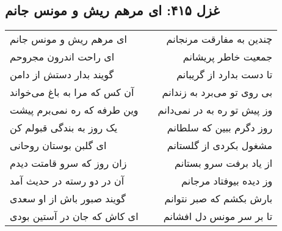 \begin{center}
\section*{غزل ۴۱۵: ای مرهم ریش و مونس جانم}
\label{sec:415}
\begin{longtable}{l p{0.5cm} r}
ای مرهم ریش و مونس جانم
&&
چندین به مفارقت مرنجانم
\\
ای راحت اندرون مجروحم
&&
جمعیت خاطر پریشانم
\\
گویند بدار دستش از دامن
&&
تا دست بدارد از گریبانم
\\
آن کس که مرا به باغ می‌خواند
&&
بی روی تو می‌برد به زندانم
\\
وین طرفه که ره نمی‌برم پیشت
&&
وز پیش تو ره به در نمی‌دانم
\\
یک روز به بندگی قبولم کن
&&
روز دگرم ببین که سلطانم
\\
ای گلبن بوستان روحانی
&&
مشغول بکردی از گلستانم
\\
زان روز که سرو قامتت دیدم
&&
از یاد برفت سرو بستانم
\\
آن در دو رسته در حدیث آمد
&&
وز دیده بیوفتاد مرجانم
\\
گویند صبور باش از او سعدی
&&
بارش بکشم که صبر نتوانم
\\
ای کاش که جان در آستین بودی
&&
تا بر سر مونس دل افشانم
\\
\end{longtable}
\end{center}
